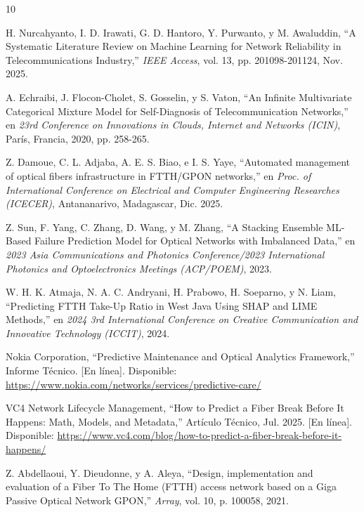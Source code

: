 \documentclass[12pt,a4paper]{article}
\begin{document}
\begin{thebibliography}{10}

H. Nurcahyanto, I. D. Irawati, G. D. Hantoro, Y. Purwanto, y M. Awaluddin, ``A Systematic Literature Review on Machine Learning for Network Reliability in Telecommunications Industry,'' \textit{IEEE Access}, vol. 13, pp. 201098-201124, Nov. 2025.

A. Echraibi, J. Flocon-Cholet, S. Gosselin, y S. Vaton, ``An Infinite Multivariate Categorical Mixture Model for Self-Diagnosis of Telecommunication Networks,'' en \textit{23rd Conference on Innovations in Clouds, Internet and Networks (ICIN)}, París, Francia, 2020, pp. 258-265.

Z. Damoue, C. L. Adjaba, A. E. S. Biao, e I. S. Yaye, ``Automated management of optical fibers infrastructure in FTTH/GPON networks,'' en \textit{Proc. of International Conference on Electrical and Computer Engineering Researches (ICECER)}, Antananarivo, Madagascar, Dic. 2025.

Z. Sun, F. Yang, C. Zhang, D. Wang, y M. Zhang, ``A Stacking Ensemble ML-Based Failure Prediction Model for Optical Networks with Imbalanced Data,'' en \textit{2023 Asia Communications and Photonics Conference/2023 International Photonics and Optoelectronics Meetings (ACP/POEM)}, 2023.

W. H. K. Atmaja, N. A. C. Andryani, H. Prabowo, H. Soeparno, y N. Liam, ``Predicting FTTH Take-Up Ratio in West Java Using SHAP and LIME Methods,'' en \textit{2024 3rd International Conference on Creative Communication and Innovative Technology (ICCIT)}, 2024.

Nokia Corporation, ``Predictive Maintenance and Optical Analytics Framework,'' Informe Técnico. [En línea]. Disponible: \url{https://www.nokia.com/networks/services/predictive-care/}

VC4 Network Lifecycle Management, ``How to Predict a Fiber Break Before It Happens: Math, Models, and Metadata,'' Artículo Técnico, Jul. 2025. [En línea]. Disponible: \url{https://www.vc4.com/blog/how-to-predict-a-fiber-break-before-it-happens/}

Z. Abdellaoui, Y. Dieudonne, y A. Aleya, ``Design, implementation and evaluation of a Fiber To The Home (FTTH) access network based on a Giga Passive Optical Network GPON,'' \textit{Array}, vol. 10, p. 100058, 2021.


\end{thebibliography}
\end{document}
